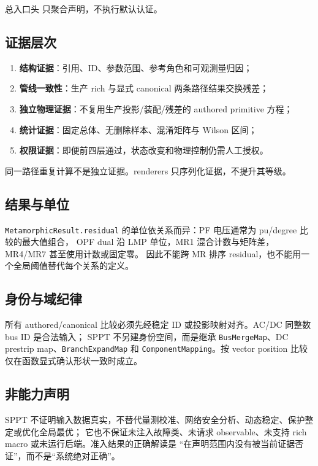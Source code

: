 总入口头  只聚合声明，不执行默认认证。

\subsection{证据层次}

\begin{enumerate}
  \item \textbf{结构证据}：引用、ID、参数范围、参考角色和可观测量归因；
  \item \textbf{管线一致性}：生产 rich 与显式 canonical 两条路径结果交换残差；
  \item \textbf{独立物理证据}：不复用生产投影/装配/残差的 authored primitive 方程；
  \item \textbf{统计证据}：固定总体、无删除样本、混淆矩阵与 Wilson 区间；
  \item \textbf{权限证据}：即便前四层通过，状态改变和物理控制仍需人工授权。
\end{enumerate}
同一路径重复计算不是独立证据。renderers 只序列化证据，不提升其等级。

\subsection{结果与单位}

\texttt{MetamorphicResult.residual} 的单位依关系而异：PF 电压通常为 pu/degree 比较的最大值组合，
OPF dual 沿 LMP 单位，MR1 混合计数与矩阵差，MR4/MR7 甚至使用计数或固定零。
因此不能跨 MR 排序 residual，也不能用一个全局阈值替代每个关系的定义。

\subsection{身份与域纪律}

所有 authored/canonical 比较必须先经稳定 ID 或投影映射对齐。AC/DC 同整数 bus ID 是合法输入；
SPPT 不另建身份空间，而是继承 \texttt{BusMergeMap}、DC prestrip map、\texttt{BranchExpandMap} 和
\texttt{ComponentMapping}。按 vector position 比较仅在函数显式确认形状一致时成立。

\subsection{非能力声明}

SPPT 不证明输入数据真实，不替代量测校准、网络安全分析、动态稳定、保护整定或优化全局最优；
它也不保证未注入故障类、未请求 observable、未支持 rich macro 或未运行后端。准入结果的正确解读是
“在声明范围内没有被当前证据否证”，而不是“系统绝对正确”。
